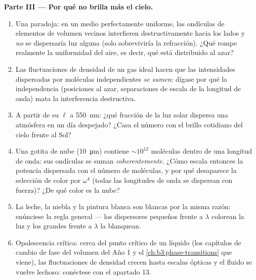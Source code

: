 \begin{problem}
\medskip\noindent\textbf{Parte III --- Por qué no brilla más el
cielo.}
\begin{enumerate}[resume]
  \item Una paradoja: en un medio perfectamente uniforme, las ondículas
        de elementos de volumen vecinos interfieren destructivamente hacia
        los lados y \emph{no} se dispersaría luz alguna (solo sobreviviría
        la refracción). ¿Qué rompe realmente la uniformidad del aire, es
        decir, qué está distribuido al azar?
  \item Las fluctuaciones de densidad de un gas ideal hacen que las
        intensidades dispersadas por moléculas independientes \emph{se
        sumen}: dígase por qué la independencia (posiciones al azar,
        separaciones de escala de la longitud de onda) mata la
        interferencia destructiva.
  \item A partir de su $\ell$ a \qty{550}{nm}: ¿qué fracción de la
        luz solar dispersa una atmósfera en un día despejado? ¿Casa
        el número con el brillo cotidiano del cielo frente al Sol?
  \item Una gotita de nube (\qty{10}{\micro m}) contiene $\sim10^{12}$
        moléculas dentro de una longitud de onda: sus ondículas se suman
        \emph{coherentemente}. ¿Cómo escala entonces la potencia
        dispersada con el número de moléculas, y por qué desaparece la
        selección de color por $\omega^4$ (todas las longitudes de onda
        se dispersan con fuerza)? ¿De qué color es la nube?
  \item La leche, la niebla y la pintura blanca son blancas por la misma
        razón: enúnciese la regla general --- los dispersores pequeños
        frente a $\lambda$ colorean la luz y los grandes frente a
        $\lambda$ la blanquean.
  \item Opalescencia crítica: cerca del punto crítico de un líquido
        (los capítulos de cambio de fase del volumen del Año 1 y el
        \cref{ch:b3:phase-transitions} que viene), las fluctuaciones de densidad crecen hasta escalas ópticas y
        el fluido se vuelve lechoso: conéctese con el apartado 13.
\end{enumerate}


\end{problem}
